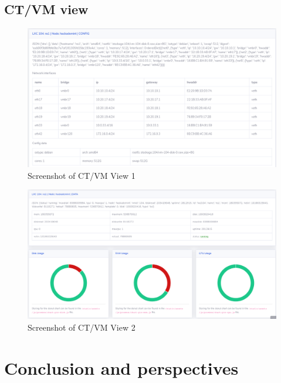 \pagebreak

\subsection{CT/VM view}

\begin{figure}[!h]
  \centering
  \includegraphics[width=1.05\textwidth]{images/flask-application-2.png}
  \caption{Screenshot of CT/VM View 1}
  \label{CTView}
\end{figure}

\begin{figure}[!h]
  \centering
  \includegraphics[width=1.05\textwidth]{images/flask-application-3.png}
  \caption{Screenshot of CT/VM View 2}
  \label{CTView2}
\end{figure}

\pagebreak

\section{Conclusion and perspectives}


